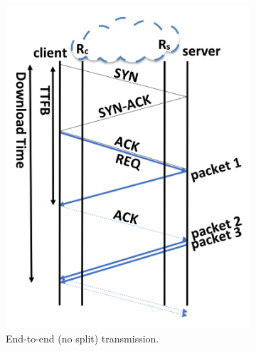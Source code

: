 \begin{figure}[!t]
\begin{subfigure}{0.65\columnwidth}
  \includegraphics[width=\columnwidth]{figures/e2e.png}
    \caption{End-to-end (no split) transmission.} \label{fig:e2e}
\end{subfigure}    \quad
\begin{subfigure}{0.65\columnwidth}
  \centering

\end{subfigure}
\end{figure}
